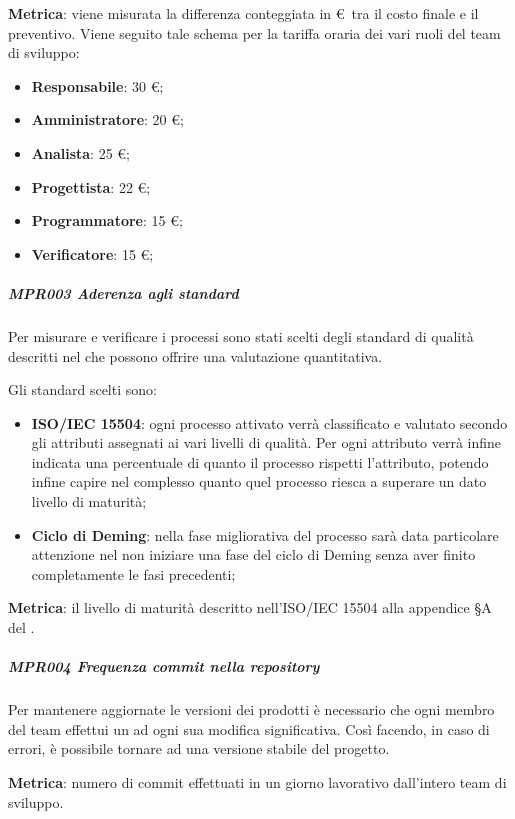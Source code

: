 				\textbf{Metrica}: viene misurata la differenza conteggiata in \euro\ tra il costo finale e il preventivo.
				Viene seguito tale schema per la tariffa oraria dei vari ruoli del team di sviluppo:

				\begin{itemize}
					\item \textbf{Responsabile}: 30 \euro;
					\item \textbf{Amministratore}: 20 \euro;
					\item \textbf{Analista}: 25 \euro;
					\item \textbf{Progettista}: 22 \euro;
					\item \textbf{Programmatore}: 15 \euro;
					\item \textbf{Verificatore}: 15 \euro;
				\end{itemize}

				\subparagraph{MPR003 Aderenza agli standard}
				Per misurare e verificare i processi sono stati scelti degli standard di qualità descritti nel \Doc{\PdQv} che possono offrire una valutazione quantitativa.

				Gli standard scelti sono:

				\begin{itemize}
				\item \textbf{ISO/IEC 15504}: ogni processo attivato verrà classificato e valutato secondo gli attributi assegnati ai vari livelli di qualità.
					Per ogni attributo verrà infine indicata una percentuale di quanto il processo rispetti l'attributo, potendo infine capire nel complesso quanto
					quel processo riesca a superare un dato livello di maturità;
				\item \textbf{Ciclo di Deming}: nella fase migliorativa del processo sarà data particolare attenzione nel non iniziare una fase del ciclo di Deming
					senza aver finito completamente le fasi precedenti;
				\end{itemize}

				\textbf{Metrica}: il livello di maturità descritto nell'ISO/IEC 15504 alla appendice §A del \Doc{\PdQv}.

				\subparagraph{MPR004 Frequenza commit nella repository}
				Per mantenere aggiornate le versioni dei prodotti è necessario che ogni membro del team effettui un  ad ogni sua modifica significativa.
				Così facendo, in caso di errori, è possibile tornare ad una versione stabile del progetto.

				\textbf{Metrica}: numero di commit effettuati in un giorno lavorativo dall'intero team di sviluppo.


